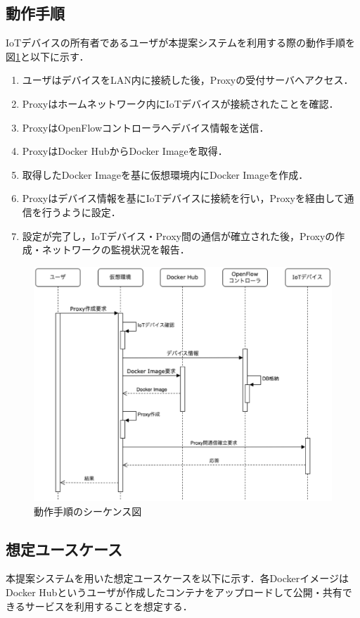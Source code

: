 \documentclass[Japanese]{dicomopapers}
\begin{document}
\subsection{動作手順}
IoTデバイスの所有者であるユーザが本提案システムを利用する際の動作手順を図\ref{fig:seaquence}と以下に示す．
\begin{enumerate}
	\item ユーザはデバイスをLAN内に接続した後，Proxyの受付サーバへアクセス．
	\item Proxyはホームネットワーク内にIoTデバイスが接続されたことを確認．
	\item ProxyはOpenFlowコントローラへデバイス情報を送信．
	\item ProxyはDocker HubからDocker Imageを取得．
	\item 取得したDocker Imageを基に仮想環境内にDocker Imageを作成．
	\item Proxyはデバイス情報を基にIoTデバイスに接続を行い，Proxyを経由して通信を行うように設定．
	\item 設定が完了し，IoTデバイス・Proxy間の通信が確立された後，Proxyの作成・ネットワークの監視状況を報告．
\end{enumerate}


\begin{figure}[!tb]
	\centering
	\includegraphics[width=\linewidth]{img/seaquence.eps}
	\caption{動作手順のシーケンス図}
	\label{fig:seaquence}
\end{figure}

\subsection{想定ユースケース}
本提案システムを用いた想定ユースケースを以下に示す．各DockerイメージはDocker Hubというユーザが作成したコンテナをアップロードして公開・共有できるサービスを利用することを想定する．
\end{document}
